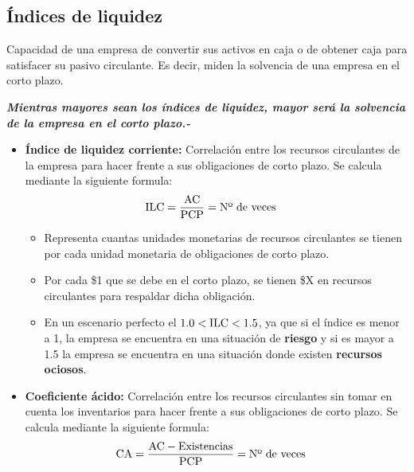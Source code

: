 \documentclass{templateNote}
\begin{document}
\subsection{Índices de liquidez}
\noindent Capacidad de una empresa de convertir sus activos en caja o de obtener caja para satisfacer su pasivo circulante. Es decir, miden la solvencia de una empresa en el corto plazo.

\begin{tcolorbox}[colback=orange!10!white,colframe=orange!60!black,title=Observación]
    \textit{\textbf{Mientras mayores sean los índices de liquidez, mayor será la solvencia de la empresa en el corto plazo.-}}
\end{tcolorbox}

\begin{itemize}
    \item \textbf{Índice de liquidez corriente:} Correlación entre los recursos circulantes de la empresa para hacer frente a sus obligaciones de corto plazo. Se calcula mediante la siguiente formula:
    \begin{align*}
        \textnormal{ILC} &= \frac{\textnormal{AC}}{\textnormal{PCP}} = \textnormal{Nº de veces}
    \end{align*}
    
    \begin{itemize}
        \item Representa cuantas unidades monetarias de recursos circulantes se tienen por cada unidad monetaria de obligaciones de corto plazo.
        \item Por cada \$1 que se debe en el corto plazo, se tienen \$X en recursos circulantes para respaldar dicha obligación.
        \item En un escenario perfecto el \textbf{$1.0 < \textnormal{ILC} < 1.5$}, ya que si el índice es menor a 1, la empresa se encuentra en una situación de \textbf{riesgo} y si es mayor a 1.5 la empresa se encuentra en una situación donde existen \textbf{recursos ociosos}.
    \end{itemize}

    \item \textbf{Coeficiente ácido:} Correlación entre los recursos circulantes sin tomar en cuenta los inventarios para hacer frente a sus obligaciones de corto plazo. Se calcula mediante la siguiente formula:
    \begin{align*}
        \textnormal{CA} &= \frac{\textnormal{AC} - \textnormal{Existencias}}{\textnormal{PCP}} = \textnormal{Nº de veces}
    \end{align*} 


\end{itemize}
\end{document}
